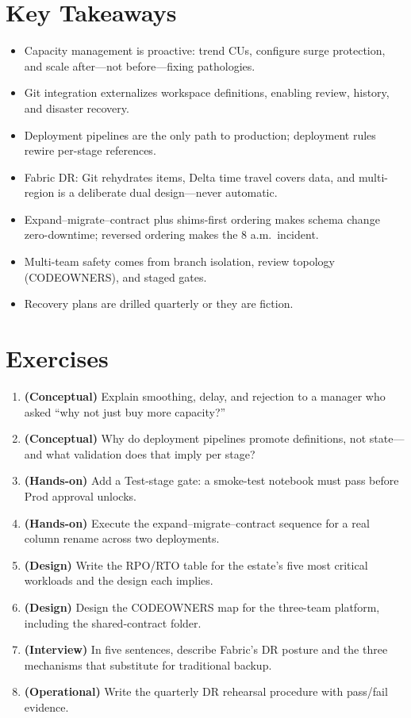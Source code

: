 \section*{Key Takeaways}
\begin{itemize}
    \item Capacity management is proactive: trend CUs, configure surge protection, and scale after---not before---fixing pathologies.
    \item Git integration externalizes workspace definitions, enabling review, history, and disaster recovery.
    \item Deployment pipelines are the only path to production; deployment rules rewire per-stage references.
    \item Fabric DR: Git rehydrates items, Delta time travel covers data, and multi-region is a deliberate dual design---never automatic.
    \item Expand--migrate--contract plus shims-first ordering makes schema change zero-downtime; reversed ordering makes the 8 a.m.\ incident.
    \item Multi-team safety comes from branch isolation, review topology (CODEOWNERS), and staged gates.
    \item Recovery plans are drilled quarterly or they are fiction.
\end{itemize}

\section{Exercises}
\begin{enumerate}
    \item \textbf{(Conceptual)} Explain smoothing, delay, and rejection to a manager who asked ``why not just buy more capacity?''
    \item \textbf{(Conceptual)} Why do deployment pipelines promote definitions, not state---and what validation does that imply per stage?
    \item \textbf{(Hands-on)} Add a Test-stage gate: a smoke-test notebook must pass before Prod approval unlocks.
    \item \textbf{(Hands-on)} Execute the expand--migrate--contract sequence for a real column rename across two deployments.
    \item \textbf{(Design)} Write the RPO/RTO table for the estate's five most critical workloads and the design each implies.
    \item \textbf{(Design)} Design the CODEOWNERS map for the three-team platform, including the shared-contract folder.
    \item \textbf{(Interview)} In five sentences, describe Fabric's DR posture and the three mechanisms that substitute for traditional backup.
    \item \textbf{(Operational)} Write the quarterly DR rehearsal procedure with pass/fail evidence.
\end{enumerate}

